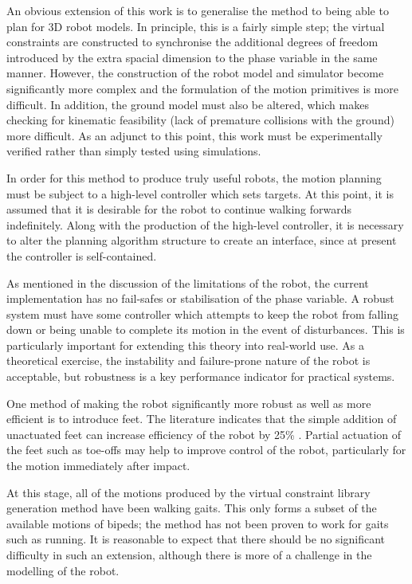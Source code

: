An obvious extension of this work is to generalise the method to being able to plan for 3D robot models. In principle, this is a fairly simple step; the virtual constraints are constructed to synchronise the additional degrees of freedom introduced by the extra spacial dimension to the phase variable in the same manner. However, the construction of the robot model and simulator become significantly more complex and the formulation of the motion primitives is more difficult. In addition, the ground model must also be altered, which makes checking for kinematic feasibility (lack of premature collisions with the ground) more difficult. As an adjunct to this point, this work must be experimentally verified rather than simply tested using simulations.

In order for this method to produce truly useful robots, the motion planning must be subject to a high-level controller which sets targets. At this point, it is assumed that it is desirable for the robot to continue walking forwards indefinitely. Along with the production of the high-level controller, it is necessary to alter the planning algorithm structure to create an interface, since at present the controller is self-contained.

As mentioned in the discussion of the limitations of the robot, the current implementation has no fail-safes or stabilisation of the phase variable. A robust system must have some controller which attempts to keep the robot from falling down or being unable to complete its motion in the event of disturbances. This is particularly important for extending this theory into real-world use. As a theoretical exercise, the instability and failure-prone nature of the robot is acceptable, but robustness is a key performance indicator for practical systems.

One method of making the robot significantly more robust as well as more efficient is to introduce feet. The literature indicates that the simple addition of unactuated feet can increase efficiency of the robot by 25\% \cite{asano2007dynamic}. Partial actuation of the feet such as toe-offs may help to improve control of the robot, particularly for the motion immediately after impact.

At this stage, all of the motions produced by the virtual constraint library generation method have been walking gaits. This only forms a subset of the available motions of bipeds; the method has not been proven to work for gaits such as running. It is reasonable to expect that there should be no significant difficulty in such an extension, although there is more of a challenge in the modelling of the robot.

